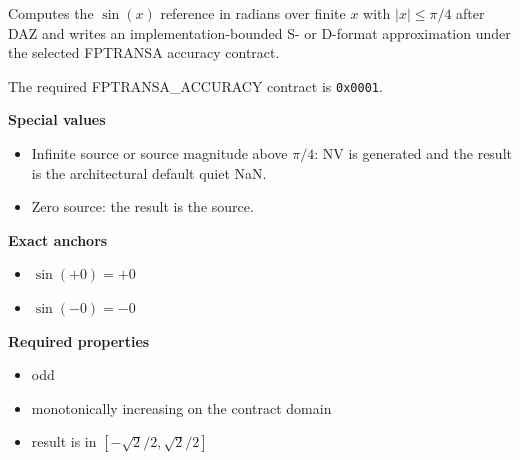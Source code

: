 Computes the $\sin(x)$ reference in radians over finite $x$ with $|x| \le \pi/4$ after DAZ and writes an implementation-bounded S- or D-format approximation under the selected FPTRANSA accuracy contract.

The required FPTRANSA\_ACCURACY contract is \texttt{0x0001}.

\textbf{Special values}\par
\begin{itemize}
\item Infinite source or source magnitude above $\pi/4$: NV is generated and the result is the architectural default quiet NaN.
\item Zero source: the result is the source.
\end{itemize}

\textbf{Exact anchors}\par
\begin{itemize}
\item $\sin(+0) = +0$
\item $\sin(-0) = -0$
\end{itemize}

\textbf{Required properties}\par
\begin{itemize}
\item odd
\item monotonically increasing on the contract domain
\item result is in $[-\sqrt{2}/2, \sqrt{2}/2]$
\end{itemize}
